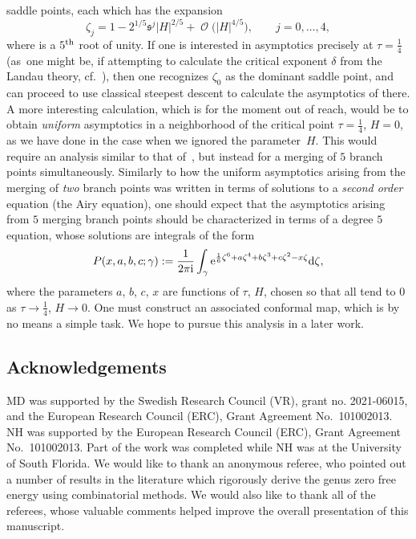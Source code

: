 \documentclass[10pt,a4paper]{amsart}
\DeclareMathOperator{\OO}{\mathcal{O}}
\numberwithin{equation}{section}
\begin{document}
\begin{Remark}
 saddle points, each which has the expansion
 \begin{equation*}
 \zeta_j = 1 - 2^{1/5} \mathfrak{s}^j |H|^{2/5} + \OO\bigl(|H|^{4/5}\bigr),\qquad j=0,\dots,4,
 \end{equation*}
 where  is a $5^{\rm th}$ root of unity. If one is interested in asymptotics precisely at $\tau = \frac{1}{4}$ (as~one might be, if attempting to calculate the critical exponent $\delta$ from the Landau theory, cf.~\cite{Kazakov2}), then one
 recognizes $\zeta_0$ as the dominant saddle point, and can proceed to use classical steepest descent to calculate the asymptotics of
  there. A more interesting calculation, which is for the moment out of reach, would be to obtain \textit{uniform}
 asymptotics in a neighborhood of the critical point $\tau =\frac{1}{4}$, $H=0$, as we have done in the case when we ignored the parameter~$H$.
 This would require an analysis similar to that of~\cite{CFU}, but instead for a merging of $5$ branch points simultaneously. Similarly to
 how the uniform asymptotics arising from the merging of \textit{two} branch points was written in terms of solutions to a \textit{second order} equation (the Airy equation), one should expect that the asymptotics arising from $5$ merging branch points should be characterized in terms of a degree $5$ equation, whose solutions are integrals of the form
 \begin{equation*}
 P(x,a,b,c;\gamma) := \frac{1}{2\pi {\rm i}}\int_{\gamma}{\rm e}^{\frac{1}{6}\zeta^{6} + a\zeta^4 + b\zeta^3 + c\zeta^2 - x\zeta} {\rm d}\zeta,
 \end{equation*}
 where the parameters $a$, $b$, $c$, $x$ are functions of $\tau$, $H$, chosen so that all tend to $0$ as $\tau\to\frac{1}{4}$, $H\to 0$. One must construct an associated conformal map, which is by no means a simple task. We hope to pursue this analysis in a later work.
\end{Remark}

\subsection*{Acknowledgements}
MD was supported by the Swedish Research Council (VR), grant no. 2021-06015, and the European Research
Council (ERC), Grant Agreement No.~101002013. NH was supported by the European Research
Council (ERC), Grant Agreement No.~101002013. Part of the work was completed while NH was at the University of South Florida. We would like to thank an anonymous referee, who pointed out a number of results in the literature which rigorously derive the genus zero free energy using combinatorial methods. We would also like to thank all of the referees, whose valuable comments helped improve the overall presentation of this manuscript.
\end{document}
